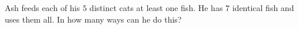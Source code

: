 Ash feeds each of his $5$ distinct cats at least one fish. He has $7$ identical fish and uses them all. In how many ways can he do this?
